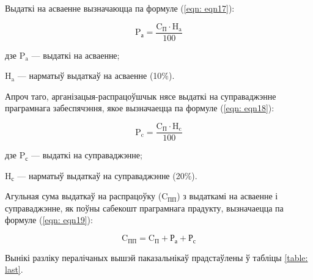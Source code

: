 Выдаткі на асваенне вызначаюцца па формуле (\ref{eqn: eqn17}):

\begin{equation}
    \label{eqn: eqn17}
    \text{P}_\text{а} = \frac{\text{C}_\text{П} \cdot \text{H}_\text{a}}{100}
\end{equation}
\begin{Explanation}
    \item[дзе] $\text{P}_\text{a}$ --- выдаткі на асваенне;
    \item $\text{H}_\text{a}$ --- нарматыў выдаткаў на асваенне (10\%).
\end{Explanation}

Апроч таго, арганізацыя-распрацоўшчык нясе выдаткі на суправаджэнне праграмнага забеспячэння, якое вызначаецца па формуле (\ref{eqn: eqn18}):

\begin{equation}
    \label{eqn: eqn18}
    \text{P}_\text{c} = \frac{\text{C}_\text{П} \cdot \text{H}_\text{c}}{100}
\end{equation}
\begin{Explanation}
    \item[дзе] $\text{P}_\text{с}$ --- выдаткі на суправаджэнне;
    \item $\text{H}_\text{с}$ --- нарматыў выдаткаў на суправаджэнне (20\%).
\end{Explanation}

Агульная сума выдаткаў на распрацоўку ($\text{C}_\text{ПП}$) з выдаткамі на асваенне і суправаджэнне, як поўны сабекошт праграмнага прадукту, вызначаецца па формуле (\ref{eqn: eqn19}):

\begin{equation}
    \label{eqn: eqn19}
    \text{C}_\text{ПП} = \text{C}_\text{П} + \text{Р}_\text{а} + \text{Р}_\text{с}
\end{equation}

Вынікі разліку пералічаных вышэй паказальнікаў прадстаўлены ў табліцы \ref{table: last}.

\clearpage


